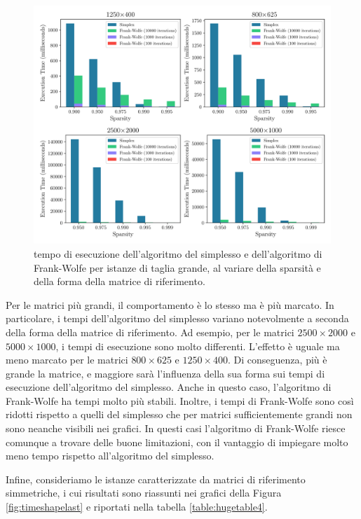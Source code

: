 \begin{figure}[!ht]
    \centering
    \includegraphics[width=\textwidth]{assets/figures/timeshape2.pdf}
    \caption{tempo di esecuzione dell'algoritmo del simplesso e dell'algoritmo di Frank-Wolfe per istanze di taglia
    grande, al variare della sparsità e della forma della matrice di riferimento.}
    \label{fig:timeshape2}
\end{figure}

Per le matrici più grandi, il comportamento è lo stesso ma è più marcato. In particolare, i tempi dell'algoritmo del
simplesso variano notevolmente a seconda della forma della matrice di riferimento. Ad esempio, per le matrici \(
2500\times 2000 \) e \( 5000\times 1000\), i tempi di esecuzione sono molto differenti. L'effetto è uguale ma meno
marcato per le matrici \( 800\times 625 \) e \( 1250\times 400 \). Di conseguenza, più è grande la matrice, e maggiore
sarà l'influenza della sua forma sui tempi di esecuzione dell'algoritmo del simplesso. Anche in questo caso, l'algoritmo
di Frank-Wolfe ha tempi molto più stabili. Inoltre, i tempi di Frank-Wolfe sono così ridotti rispetto a quelli del
simplesso che per matrici sufficientemente grandi non sono neanche visibili nei grafici. In questi casi l'algoritmo di
Frank-Wolfe riesce comunque a trovare delle buone limitazioni, con il vantaggio di impiegare molto meno tempo rispetto
all'algoritmo del simplesso.

Infine, consideriamo le istanze caratterizzate da matrici di riferimento simmetriche, i cui risultati sono riassunti nei
grafici della Figura \ref{fig:timeshapelast} e riportati nella tabella \ref{table:hugetable4}.

